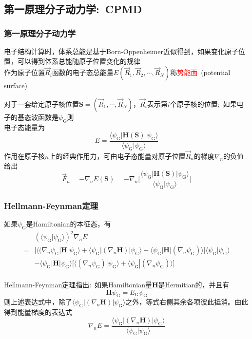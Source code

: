 \subsection{第一原理分子动力学:~{\rm CPMD}}
\frame
{
	\frametitle{第一原理分子动力学}
	电子结构计算时，体系总能是基于\textrm{Born-Oppenheimer}近似得到，如果变化原子位置，可以得到体系总能随原子位置变化的规律\\
	作为原子位置$\vec R_i$函数的电子态总能量$E(\vec R_1,\vec R_2,\cdots,\vec R_N)$称\textcolor{red}{势能面}~(\textrm{potential surface})

	对于一套给定原子核位置$\mathbf{S}=(\vec R_1,\cdots,\vec R_N)$，$\vec R_i$表示第$i$个原子核的位置;~如果电子的基态波函数是$\psi_{\mathrm{G}}$则\\电子态能量为
	\begin{displaymath}
		E=\dfrac{\langle\psi_{\mathrm{G}}|\mathbf{H}(\mathbf{S})|\psi_{\mathrm{G}}\rangle}{\langle\psi_{\mathrm{G}}|\psi_{\mathrm{G}}\rangle}
	\end{displaymath}
作用在原子核$n$上的经典作用力，可由电子态能量对原子位置$\vec R_n$的梯度$\nabla_n$的负值给出
\begin{displaymath}
	\vec F_n=-\nabla_nE(\mathbf{S})=-\nabla_n\bigg[\dfrac{\langle\psi_{\mathrm{G}}|\mathbf{H}(\mathbf{S})|\psi_{\mathrm{G}}\rangle}{\langle\psi_{\mathrm{G}}|\psi_{\mathrm{G}}\rangle}\bigg]
\end{displaymath}
}

\frame
{
	\frametitle{\textrm{Hellmann-Feynman}定理}
	如果$\psi_{\mathrm{G}}$是\textrm{Hamiltonian}的本征态，有
	\begin{displaymath}
		\begin{aligned}
			&(\langle\psi_{\mathrm{G}}|\psi_{\mathrm{G}}\rangle)^2\nabla_nE\\
			=&\big[\langle(\nabla_n\psi_{\mathrm{G}}|\mathbf{H}|\psi_{\mathrm{G}}\rangle+\langle\psi_{\mathrm{G}}|(\nabla_n\mathbf{H})|\psi_{\mathrm{G}}\rangle+\langle\psi_{\mathrm{G}}|\mathbf{H}|(\nabla_n\psi_{\mathrm{G}})\rangle\big]\langle\psi_{\mathrm{G}}|\psi_{\mathrm{G}}\rangle\\
			&-\langle\psi_{\mathrm{G}}|\mathbf{H}|\psi_{\mathrm{G}}\rangle\big[\langle(\nabla_n\psi_{\mathrm{G}})|\psi_{\mathrm{G}}\rangle+\langle\psi_{\mathrm{G}}|(\nabla_n\psi_{\mathrm{G}})\rangle\big]
		\end{aligned}
	\end{displaymath}
	{\fontsize{6.2pt}{5.2pt}}\\
	\vskip 5pt
	\textrm{Hellmann-Feynman}定理指出:~如果\textrm{Hamiltonian}量$\mathbf{H}$是\textrm{Hermitian}的，并且有
	\begin{displaymath}
		\mathbf{H}\psi_{\mathrm{G}}=E_{\mathrm{G}}\psi_{\mathrm{G}}
	\end{displaymath}
则上述表达式中，除了$\langle\psi_{\mathrm{G}}|(\nabla_n\mathbf{H})|\psi_{\mathrm{G}}\rangle$之外，等式右侧其余各项彼此抵消。由此得到能量梯度的表达式
\begin{displaymath}
	\nabla_nE=\dfrac{\langle\psi_{\mathrm{G}}|(\nabla_n\mathbf{H})|\psi_{\mathrm{G}}\rangle}{\langle\psi_{\mathrm{G}}|\psi_{\mathrm{G}}\rangle}
\end{displaymath}
}

